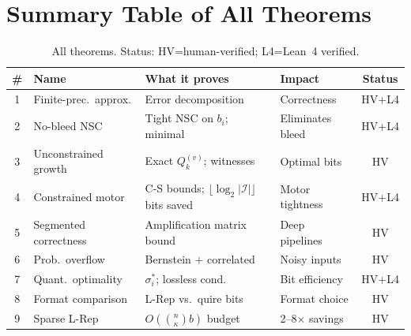 \documentclass[11pt,a4paper]{article}
\theoremstyle{definition}
\theoremstyle{plain}
\theoremstyle{remark}
\begin{document}
\section{Summary Table of All Theorems}
\label{app:summary}

\begin{table}[h]
\centering
\caption{All theorems. Status: HV=human-verified; L4=Lean~4 verified.}
\label{tab:all-thms}
\small
\begin{tabular}{cp{3cm}p{4cm}p{2cm}c}
\toprule
\# & Name & What it proves & Impact & Status \\
\midrule
1 & Finite-prec.\ approx. & Error decomposition & Correctness & HV+L4 \\
2 & No-bleed NSC & Tight NSC on $b_i$; minimal & Eliminates bleed & HV+L4 \\
3 & Unconstrained growth & Exact $Q_k^{(v)}$; witnesses & Optimal bits & HV \\
4 & Constrained motor & C-S bounds; $\lfloor\log_2|\mathcal{I}|\rfloor$ bits saved & Motor tightness & HV+L4 \\
5 & Segmented correctness & Amplification matrix bound & Deep pipelines & HV \\
6 & Prob.\ overflow & Bernstein + correlated & Noisy inputs & HV \\
7 & Quant.\ optimality & $\sigma_i^*$; lossless cond. & Bit efficiency & HV+L4 \\
8 & Format comparison & L-Rep vs.\ quire bits & Format choice & HV \\
9 & Sparse L-Rep & $O(\binom{n}{\kappa}b)$ budget & 2--8$\times$ savings & HV \\
\bottomrule
\end{tabular}
\end{table}
\end{document}
